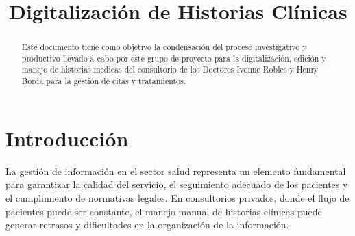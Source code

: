 \documentclass[conference]{IEEEtran}
\begin{document}
\title{Digitalización de Historias Clínicas}

\author{
    \and
    \and
    \and
}

\maketitle

\begin{abstract}
Este documento tiene como objetivo la condensación del proceso investigativo y productivo llevado a cabo por este grupo de proyecto para la digitalización, edición y manejo de historias medicas del consultorio de los Doctores Ivonne Robles y Henry Borda para la gestión de citas y tratamientos.
\end{abstract}

\section{Introducción}

La gestión de información en el sector salud representa un elemento fundamental para garantizar la calidad del servicio, el seguimiento adecuado de los pacientes y el cumplimiento de normativas legales. En consultorios privados, donde el flujo de pacientes puede ser constante, el manejo manual de historias clínicas puede generar retrasos y dificultades en la organización de la información.
\end{document}
